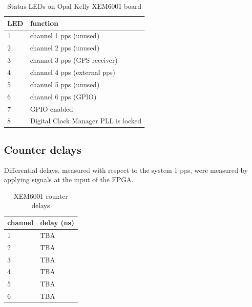 \begin{table}
\begin{center}
\begin{tabular}{ll}
LED & function \\ \hline
1 & channel 1 pps (unused)\\
2 & channel 2 pps (unused) \\
3 & channel 3 pps (GPS receiver)\\
4 & channel 4 pps (external pps)\\
5 & channel 5 pps (unused)\\
6 & channel 6 pps (GPIO)\\
7 & GPIO enabled\\
8 & Digital Clock Manager PLL is locked\\
\end{tabular}
\end{center}
\caption{Status LEDs on Opal Kelly XEM6001 board \label{t:XEM6001LEDs}}
\end{table}

\subsection{Counter delays}

Differential delays, measured with respect to the system 1 pps, were measured by
applying signals at the input of the FPGA. 

\begin{table}
\begin{center}
\begin{tabular}{ll}
channel & delay (ns) \\ \hline
1 & TBA \\
2 & TBA \\
3 & TBA \\
4 & TBA \\
5 & TBA \\
6 & TBA\\
\end{tabular}
\end{center}
\caption{XEM6001 counter delays \label{t:XEM6001 delays}}
\end{table}
